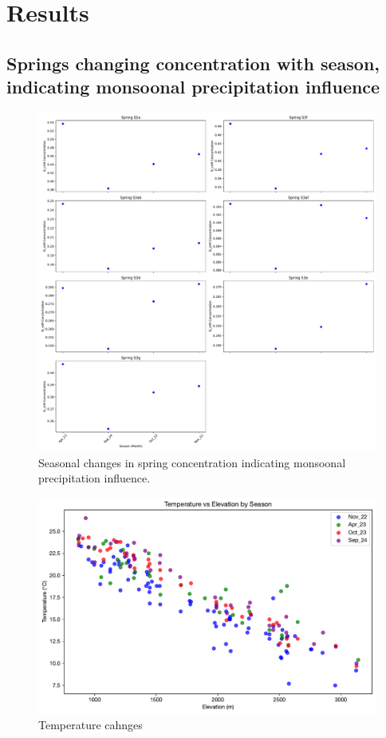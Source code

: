
\section{Results}

\subsection{Springs changing concentration with season, indicating monsoonal precipitation influence}

\begin{figure}[h]
    \centering
    \includegraphics[width=\textwidth]{Si_mM_concentrations_springs.pdf}
    \caption{Seasonal changes in spring concentration indicating monsoonal precipitation influence.}
    \label{fig:seasonal_changes}
\end{figure}

\FloatBarrier


\begin{figure}[h]
    \centering
    \includegraphics[width=\textwidth]{Temperature_Elevation_Season.pdf}
    \caption{Temperature cahnges}
    \label{fig:seasonal_change2}
\end{figure}

